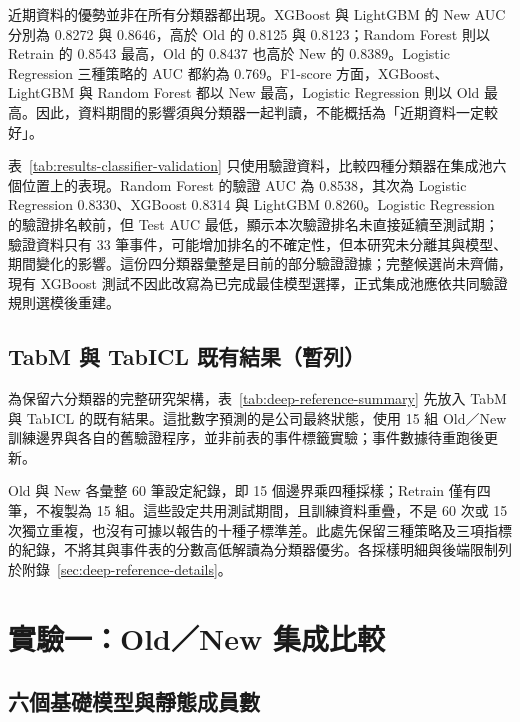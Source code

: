 近期資料的優勢並非在所有分類器都出現。XGBoost 與 LightGBM 的 New AUC 分別為 0.8272 與 0.8646，高於 Old 的 0.8125 與 0.8123；Random Forest 則以 Retrain 的 0.8543 最高，Old 的 0.8437 也高於 New 的 0.8389。Logistic Regression 三種策略的 AUC 都約為 0.769。F1-score 方面，XGBoost、LightGBM 與 Random Forest 都以 New 最高，Logistic Regression 則以 Old 最高。因此，資料期間的影響須與分類器一起判讀，不能概括為「近期資料一定較好」。

表~\ref{tab:results-classifier-validation} 只使用驗證資料，比較四種分類器在集成池六個位置上的表現。Random Forest 的驗證 AUC 為 0.8538，其次為 Logistic Regression 0.8330、XGBoost 0.8314 與 LightGBM 0.8260。Logistic Regression 的驗證排名較前，但 Test AUC 最低，顯示本次驗證排名未直接延續至測試期；驗證資料只有 33 筆事件，可能增加排名的不確定性，但本研究未分離其與模型、期間變化的影響。這份四分類器彙整是目前的部分驗證證據；完整候選尚未齊備，現有 XGBoost 測試不因此改寫為已完成最佳模型選擇，正式集成池應依共同驗證規則選模後重建。



\subsection{TabM 與 TabICL 既有結果（暫列）}\label{sec:results-deep-reference}

為保留六分類器的完整研究架構，表~\ref{tab:deep-reference-summary} 先放入 TabM 與 TabICL 的既有結果。這批數字預測的是公司最終狀態，使用 15 組 Old／New 訓練邊界與各自的舊驗證程序，並非前表的事件標籤實驗；事件數據待重跑後更新。



Old 與 New 各彙整 60 筆設定紀錄，即 15 個邊界乘四種採樣；Retrain 僅有四筆，不複製為 15 組。這些設定共用測試期間，且訓練資料重疊，不是 60 次或 15 次獨立重複，也沒有可據以報告的十種子標準差。此處先保留三種策略及三項指標的紀錄，不將其與事件表的分數高低解讀為分類器優劣。各採樣明細與後端限制列於附錄~\ref{sec:deep-reference-details}。

\section{實驗一：Old／New 集成比較}\label{sec:results-experiment1}

\subsection{六個基礎模型與靜態成員數}

